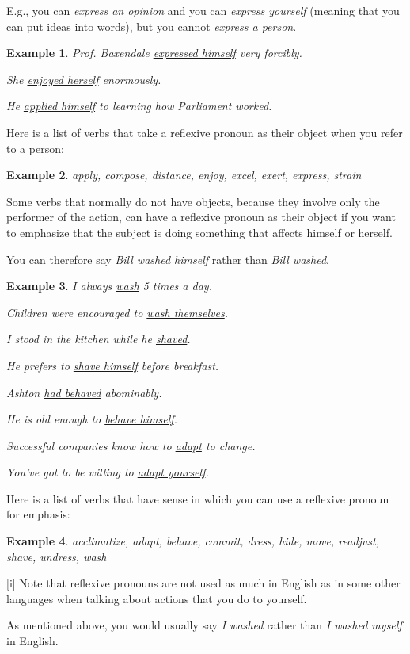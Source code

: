 \documentclass[oneside]{book}
\numberwithin{equation}{section}
\newtheorem{example}{Example}[section]
\begin{document}
E.g., you can \textit{express an opinion} and you can \textit{express yourself} (meaning that you can put ideas into words), but you cannot \textit{express a person}.
\begin{example}
    Prof. Baxendale \underline{expressed himself} very forcibly.
    
    She \underline{enjoyed herself} enormously.
    
    He \underline{applied himself} to learning how Parliament worked.
\end{example}
Here is a list of verbs that take a reflexive pronoun as their object when you refer to a person:
\begin{example}
    apply, compose, distance, enjoy, excel, exert, express, strain
\end{example}
%
\noindent{} Some verbs that normally do not have objects, because they involve only the performer of the action, can have a reflexive pronoun as their object if you want to emphasize that the subject is doing something that affects himself or herself.

You can therefore say \textit{Bill washed himself} rather than \textit{Bill washed}.
\begin{example}
    I always \underline{wash} 5 times a day.
    
    Children were encouraged to \underline{wash themselves}.
    
    I stood in the kitchen while he \underline{shaved}.
    
    He prefers to \underline{shave himself} before breakfast.
    
    Ashton \underline{had behaved} abominably.
    
    He is old enough to \underline{behave himself}.
    
    Successful companies know how to \underline{adapt} to change.
    
    You've got to be willing to \underline{adapt yourself}.
\end{example}
Here is a list of verbs that have sense in which you can use a reflexive pronoun for emphasis:
\begin{example}
    acclimatize, adapt, behave, commit, dress, hide, move, readjust, shave, undress, wash
\end{example}
%
\noindent{} [i] Note that reflexive pronouns are not used as much in English as in some other languages when talking about actions that you do to yourself.

As mentioned above, you would usually say \textit{I washed} rather than \textit{I washed myself} in English.
\end{document}

